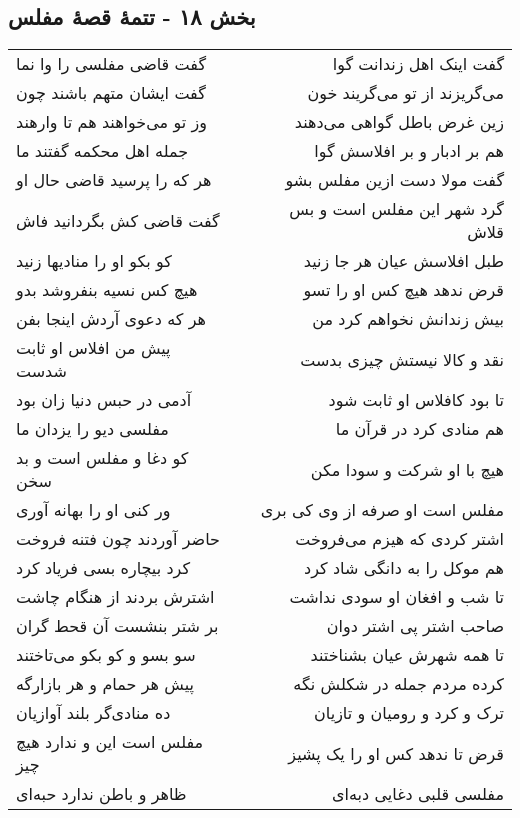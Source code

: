 \begin{center}
\section*{بخش ۱۸ - تتمهٔ قصهٔ مفلس}
\label{sec:sh018}
\begin{longtable}{l p{0.5cm} r}
گفت قاضی مفلسی را وا نما
&&
گفت اینک اهل زندانت گوا
\\
گفت ایشان متهم باشند چون
&&
می‌گریزند از تو می‌گریند خون
\\
وز تو می‌خواهند هم تا وارهند
&&
زین غرض باطل گواهی می‌دهند
\\
جمله اهل محکمه گفتند ما
&&
هم بر ادبار و بر افلاسش گوا
\\
هر که را پرسید قاضی حال او
&&
گفت مولا دست ازین مفلس بشو
\\
گفت قاضی کش بگردانید فاش
&&
گرد شهر این مفلس است و بس قلاش
\\
کو بکو او را منادیها زنید
&&
طبل افلاسش عیان هر جا زنید
\\
هیچ کس نسیه بنفروشد بدو
&&
قرض ندهد هیچ کس او را تسو
\\
هر که دعوی آردش اینجا بفن
&&
بیش زندانش نخواهم کرد من
\\
پیش من افلاس او ثابت شدست
&&
نقد و کالا نیستش چیزی بدست
\\
آدمی در حبس دنیا زان بود
&&
تا بود کافلاس او ثابت شود
\\
مفلسی دیو را یزدان ما
&&
هم منادی کرد در قرآن ما
\\
کو دغا و مفلس است و بد سخن
&&
هیچ با او شرکت و سودا مکن
\\
ور کنی او را بهانه آوری
&&
مفلس است او صرفه از وی کی بری
\\
حاضر آوردند چون فتنه فروخت
&&
اشتر کردی که هیزم می‌فروخت
\\
کرد بیچاره بسی فریاد کرد
&&
هم موکل را به دانگی شاد کرد
\\
اشترش بردند از هنگام چاشت
&&
تا شب و افغان او سودی نداشت
\\
بر شتر بنشست آن قحط گران
&&
صاحب اشتر پی اشتر دوان
\\
سو بسو و کو بکو می‌تاختند
&&
تا همه شهرش عیان بشناختند
\\
پیش هر حمام و هر بازارگه
&&
کرده مردم جمله در شکلش نگه
\\
ده منادی‌گر بلند آوازیان
&&
ترک و کرد و رومیان و تازیان
\\
مفلس است این و ندارد هیچ چیز
&&
قرض تا ندهد کس او را یک پشیز
\\
ظاهر و باطن ندارد حبه‌ای
&&
مفلسی قلبی دغایی دبه‌ای

\end{longtable}
\end{center}

